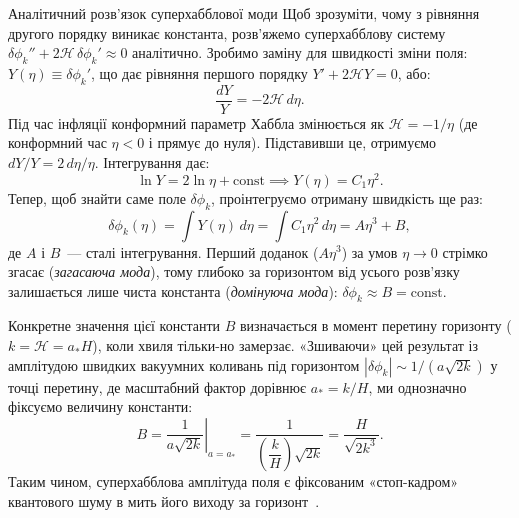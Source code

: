 \begin{itemize}
\begin{mathbox}{Аналітичний розв'язок суперхабблової моди}
    Щоб зрозуміти, чому з рівняння другого порядку виникає константа, роз\-в'я\-же\-мо суперхабблову систему
    $\delta\phi_k'' + 2\mathcal{H}\,\delta\phi_k' \approx 0$ аналітично. Зробимо заміну для швидкості зміни поля:
    $Y(\eta) \equiv \delta\phi_k'$, що дає рівняння першого порядку $Y' + 2\mathcal{H}Y = 0$, або:
    \begin{equation*}
      \frac{dY}{Y} = -2\mathcal{H}\,d\eta.
    \end{equation*}
    Під час інфляції конформний параметр Хаббла змінюється як $\mathcal{H} = -1/\eta$ (де конформний час
    $\eta < 0$ і прямує до нуля). Підставивши це, отримуємо $dY/Y = 2\,d\eta/\eta$. Інтегрування дає:
    \begin{equation*}
      \ln Y = 2\ln\eta + \text{const} \implies Y(\eta) = C_1 \eta^2.
    \end{equation*}
    Тепер, щоб знайти саме поле $\delta\phi_k$, проінтегруємо отриману швидкість ще раз:
    \begin{equation*}
      \delta\phi_k(\eta) = \int Y(\eta)\,d\eta = \int C_1 \eta^2\,d\eta = A\eta^3 + B,
    \end{equation*}
    де $A$ і $B$~--- сталі інтегрування. Перший доданок ($A\eta^3$) за умов $\eta \to 0$ стрімко згасає
    (\emph{загасаюча мода}), тому глибоко за горизонтом від усього розв'язку залишається лише чиста константа
    (\emph{домінуюча мода}): $\delta\phi_k \approx B = \mathrm{const}$.

    Конкретне значення цієї константи $B$ визначається в момент перетину горизонту ($k = \mathcal{H} = a_* H$),
    коли хвиля тільки-но замерзає. «Зшиваючи» цей результат із амплітудою швидких вакуумних коливань під
    горизонтом $|\delta\phi_k| \sim 1/(a\sqrt{2k})$ у точці перетину, де масштабний фактор дорівнює $a_* = k/H$,
    ми однозначно фіксуємо величину константи:
    \begin{equation*}
      B = \left. \frac{1}{a\sqrt{2k}} \right|_{a = a_*} = \frac{1}{\left(\dfrac{k}{H}\right)\sqrt{2k}} = \frac{H}{\sqrt{2k^3}}.
    \end{equation*}
    Таким чином, суперхабблова амплітуда поля є фіксованим «стоп-кадром» квантового шуму в мить його виходу за горизонт~\cite{guth_pi_1982}.
\end{mathbox}
\end{itemize}


